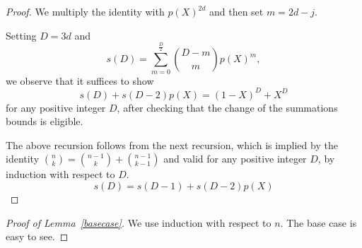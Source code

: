 \documentclass[12pt,dvipsnames]{amsart}
\theoremstyle{definition}
\begin{document}
\begin{proof}
We multiply the identity with $p(X)^{2d}$ and then set $m=2d-j$. 

Setting $D=3d$ and 
$$
s(D)= \sum_{m=0}^{\frac{D}{2}}  \binom{D-m}{m} p(X)^{m}, 
$$
we observe that it suffices to show 
 $$
s(D) + s(D-2) p(X) = (1-X)^{D}+X^D
$$
for any positive integer $D$, after checking that the change of the summations bounds is 
eligible. 

The above recursion follows from the next recursion, which is implied by the identity 
$\binom{n}{k}=\binom{n-1}{k}+\binom{n-1}{k-1}$ and valid for any positive integer $D$, by induction with respect to $D$.
$$
s(D) = s(D-1) + s(D-2) p(X)
$$
 \end{proof} 
 
\begin{proof}[Proof of Lemma~\ref{basecase}]
We use induction with respect to $n$. The base case is easy to see. 
 

\end{proof}
\end{document}
